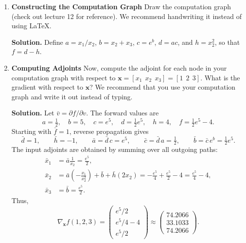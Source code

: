 \documentclass[11pt]{article}
\begin{document}
\begin{enumerate}[label=\textbf{Q\arabic*.}, leftmargin=2.2em]

\item \textbf{Constructing the Computation Graph} Draw the computation graph (check out lecture 12 for reference). We recommend handwriting it instead of using \LaTeX.
\par\smallskip
\textbf{Solution.} Define $a=x_1/x_2$, $b=x_2+x_3$, $c=e^b$,
$d=ac$, and $h=x_2^2$, so that $f=d-h$.
\begin{center}
\end{center}

\item \textbf{Computing Adjoints}
Now, compute the adjoint for each node in your computation graph with respect to $\textbf{x} = [x_1 \ \ x_2 \ \ x_3] = [1 \ \ 2 \ \ 3]$. What is the gradient with respect to $\textbf{x}$? We recommend that you use your computation graph and write it out instead of typing.
\par\smallskip
\textbf{Solution.} Let $\bar v=\partial f/\partial v$. The forward values are
\[
a=\tfrac12,\quad b=5,\quad c=e^5,\quad
d=\tfrac12e^5,\quad h=4,\quad f=\tfrac12e^5-4.
\]
Starting with $\bar f=1$, reverse propagation gives
\[
\bar d=1,\qquad \bar h=-1,\qquad
\bar a=\bar d\,c=e^5,\qquad
\bar c=\bar d\,a=\tfrac12,\qquad
\bar b=\bar c\,e^b=\tfrac12e^5.
\]
The input adjoints are obtained by summing over all outgoing paths:
\begin{align*}
\bar x_1&=\bar a\frac{1}{x_2}=\frac{e^5}{2},\\
\bar x_2&=\bar a\left(-\frac{x_1}{x_2^2}\right)
          +\bar b+\bar h(2x_2)
          =-\frac{e^5}{4}+\frac{e^5}{2}-4
          =\frac{e^5}{4}-4,\\
\bar x_3&=\bar b=\frac{e^5}{2}.
\end{align*}
Thus,
\[
\boxed{\nabla_{\mathbf{x}}f(1,2,3)=
\begin{pmatrix}e^5/2\\e^5/4-4\\e^5/2\end{pmatrix}
\approx\begin{pmatrix}74.2066\\33.1033\\74.2066\end{pmatrix}.}
\]

\end{enumerate}
\end{document}
